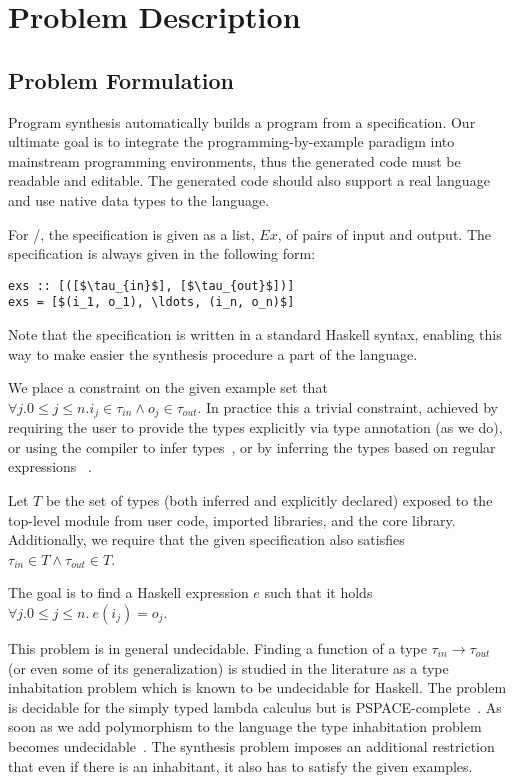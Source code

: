 \section{Problem Description}
\label{problem}

\subsection{Problem Formulation}


Program synthesis automatically builds a program from a specification.
Our ultimate goal is to integrate the programming-by-example paradigm 
into mainstream programming environments, thus the generated code must be readable and editable. The generated code should also support a real language and use native data types to the language.

For \ourTool/, the specification is given as a list, $Ex$, of pairs of input and output. The specification is always given in the following 
form:
\begin{lstlisting}[mathescape=true]
exs :: [([$\tau_{in}$], [$\tau_{out}$])]
exs = [$(i_1, o_1), \ldots, (i_n, o_n)$]
\end{lstlisting}


Note that the specification is written in a standard Haskell syntax, enabling this way to make easier the synthesis procedure a part of the language.

We place a constraint on the given example set that $\forall j. 0 \le j \le n. i_j \in \tau_{in} \land o_j \in \tau_{out}$. In practice this a trivial constraint, achieved by requiring the user to provide the types explicitly via type annotation (as we do), or using the compiler to infer types~\cite{ghc}, or by inferring the types based on regular expressions~\cite{gulwani_popl15} .

Let $T$ be the set of types (both inferred and explicitly declared) exposed to the top-level module from user code, imported libraries, and the core library. Additionally, we require that the given specification also satisfies $\tau_{in} \in T \land
\tau_{out} \in T$.

The goal is to find a Haskell expression $e$ such that it holds $\forall j. 0 \le j \le n.\  e (i_j) = o_j$.

This problem is in general undecidable. Finding a function of a type 
$\tau_{in} \rightarrow \tau_{out}$ (or even some of its generalization) is studied in the literature as a type inhabitation problem which is known to be undecidable 
for Haskell. The problem is decidable for 
 the simply typed lambda calculus but is PSPACE-complete~\cite{DBLP:conf/tlca/Urzyczyn97}. 
 As soon as we add polymorphism to the language the type inhabitation problem becomes undecidable~\cite{DBLP:conf/lics/Wells94}. The synthesis problem imposes an additional restriction that even if there is an inhabitant, it also has to satisfy the given examples.

